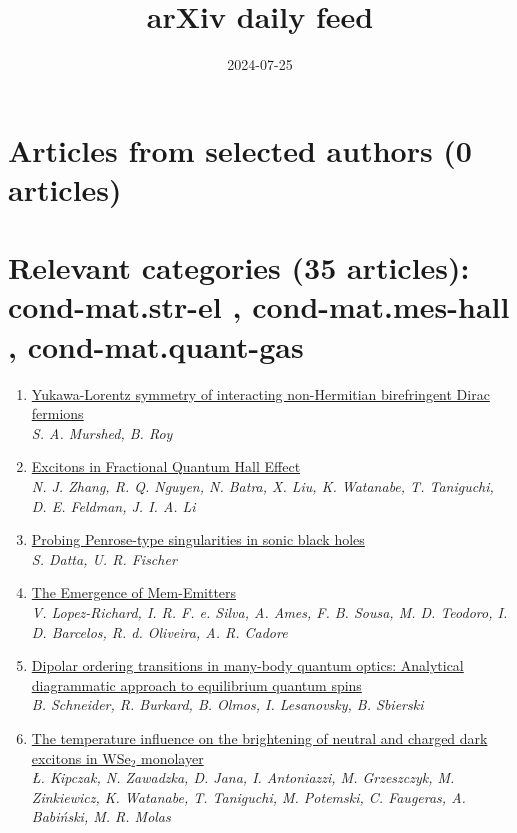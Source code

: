 \documentclass{article}
\title{arXiv daily feed}
\author{}
\date{2024-07-25}
\begin{document}
\maketitle

\section*{Articles from selected authors (0 articles)}
\section*{Relevant categories (35 articles): 
cond-mat.str-el
, 
cond-mat.mes-hall
, 
cond-mat.quant-gas
}
\begin{enumerate}
\item\href{http://arxiv.org/abs/2407.18250v1}{\textsf{Yukawa-Lorentz symmetry of interacting non-Hermitian birefringent Dirac
  fermions}}\\
{\small\color{blue}\textsl{S. A. Murshed, B. Roy}}
\item\href{http://arxiv.org/abs/2407.18224v1}{\textsf{Excitons in Fractional Quantum Hall Effect}}\\
{\small\color{blue}\textsl{N. J. Zhang, R. Q. Nguyen, N. Batra, X. Liu, K. Watanabe, T. Taniguchi, D. E. Feldman, J. I. A. Li}}
\item\href{http://arxiv.org/abs/2407.18165v1}{\textsf{Probing Penrose-type singularities in sonic black holes}}\\
{\small\color{blue}\textsl{S. Datta, U. R. Fischer}}
\item\href{http://arxiv.org/abs/2407.18164v1}{\textsf{The Emergence of Mem-Emitters}}\\
{\small\color{blue}\textsl{V. Lopez-Richard, I. R. F. e. Silva, A. Ames, F. B. Sousa, M. D. Teodoro, I. D. Barcelos, R. d. Oliveira, A. R. Cadore}}
\item\href{http://arxiv.org/abs/2407.18156v1}{\textsf{Dipolar ordering transitions in many-body quantum optics: Analytical
  diagrammatic approach to equilibrium quantum spins}}\\
{\small\color{blue}\textsl{B. Schneider, R. Burkard, B. Olmos, I. Lesanovsky, B. Sbierski}}
\item\href{http://arxiv.org/abs/2407.18117v1}{\textsf{The temperature influence on the brightening of neutral and charged dark
  excitons in WSe$_2$ monolayer}}\\
{\small\color{blue}\textsl{Ł. Kipczak, N. Zawadzka, D. Jana, I. Antoniazzi, M. Grzeszczyk, M. Zinkiewicz, K. Watanabe, T. Taniguchi, M. Potemski, C. Faugeras, A. Babiński, M. R. Molas}}

\end{enumerate}
\end{document}
